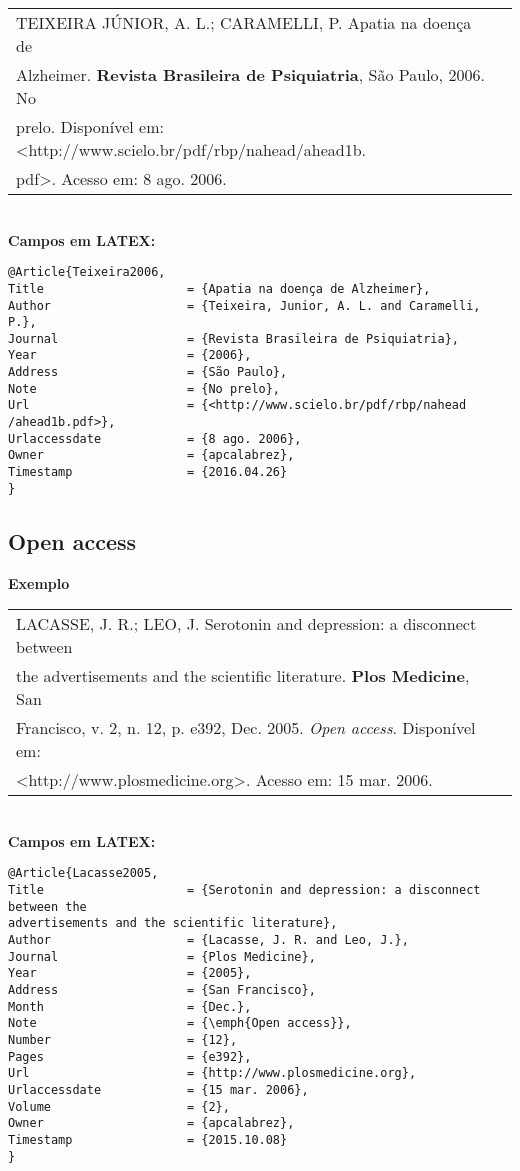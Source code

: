 \begin{tabular}{|l|c|} \hline
TEIXEIRA JÚNIOR, A. L.; CARAMELLI, P. Apatia na doença de \\Alzheimer. \textbf{Revista Brasileira de Psiquiatria}, São Paulo, 2006. No\\ prelo. Disponível em:
<http://www.scielo.br/pdf/rbp/nahead/ahead1b.\\pdf>. Acesso em: 8 ago.
2006. 
	\\\hline
\end{tabular} \\

\textbf{Campos em LATEX:} 

\begin{verbatim}
@Article{Teixeira2006,
Title                    = {Apatia na doença de Alzheimer},
Author                   = {Teixeira, Junior, A. L. and Caramelli, 
P.},
Journal                  = {Revista Brasileira de Psiquiatria},
Year                     = {2006},
Address                  = {São Paulo},
Note                     = {No prelo},
Url                      = {<http://www.scielo.br/pdf/rbp/nahead
/ahead1b.pdf>},
Urlaccessdate            = {8 ago. 2006},
Owner                    = {apcalabrez},
Timestamp                = {2016.04.26}
}
\end{verbatim}

\subsection{Open access}

\textbf{Exemplo} \\

\begin{tabular}{|l|c|} \hline
LACASSE, J. R.; LEO, J. Serotonin and depression: a disconnect between \\ the advertisements and the scientific literature. \textbf{Plos Medicine}, San \\Francisco, v. 2, n. 12, p. e392, Dec. 2005. \emph{Open access}. Disponível em: \\<http://www.plosmedicine.org>. Acesso em: 15 mar. 2006. 
	\\\hline
\end{tabular} \\

\textbf{Campos em LATEX:} 

\begin{verbatim}
@Article{Lacasse2005,
Title                    = {Serotonin and depression: a disconnect 
between the 
advertisements and the scientific literature},
Author                   = {Lacasse, J. R. and Leo, J.},
Journal                  = {Plos Medicine},
Year                     = {2005},
Address                  = {San Francisco},
Month                    = {Dec.},
Note                     = {\emph{Open access}},
Number                   = {12},
Pages                    = {e392},
Url                      = {http://www.plosmedicine.org},
Urlaccessdate            = {15 mar. 2006},
Volume                   = {2},
Owner                    = {apcalabrez},
Timestamp                = {2015.10.08}
}
\end{verbatim}


